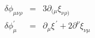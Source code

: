 \begin{equation}
  \begin{array}{rcl}
  \delta \phi_{\mu\nu\rho} &=& 3 \partial_{( \mu} \xi_{\nu\rho )} \\
  \delta \phi^{\prime}_{\mu} &=& \partial_{\mu} \xi^{\,\prime} +2 
\partial^{\nu} \xi_{\nu\mu} \\
  \end{array}
\label{eq:b2}
\end{equation}


